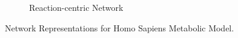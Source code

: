 \begin{figure}[!ht]
\begin{subfigure}{0.5\textwidth}
		\caption{Reaction-centric Network}
		\label{figure-reaction-centric}
	\end{subfigure}
	\caption{Network Representations for Homo Sapiens Metabolic Model.}
	\label{figure-metabolic-networks}
\end{figure}
